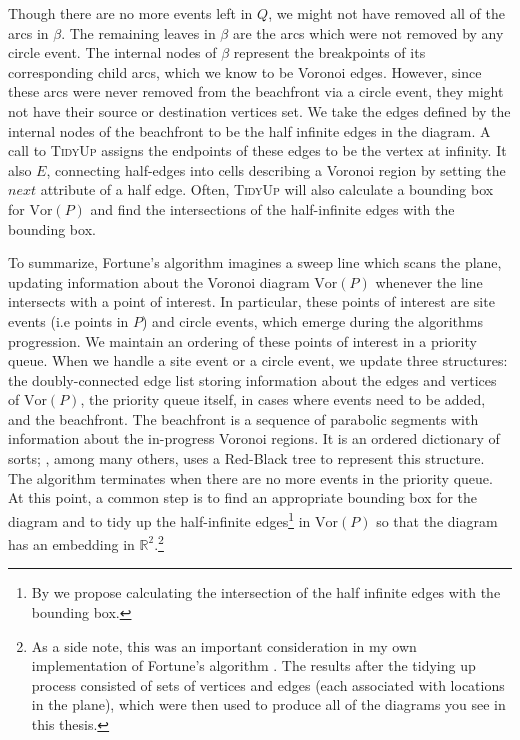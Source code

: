 \documentclass[12pt,twoside]{reedthesis}
\begin{document}
    Though there are no more events left in $Q$, we might not have removed all of the arcs in $\beta$. The remaining leaves in $\beta$ are the arcs which were not removed by any circle event. The internal nodes of $\beta$ represent the breakpoints of its corresponding child arcs, which we know to be Voronoi edges. However, since these arcs were never removed from the beachfront via a circle event, they might not have their source or destination vertices set. We take the edges defined by the internal nodes of the beachfront to be the half infinite edges in the diagram. A call to \textsc{TidyUp} assigns the endpoints of these edges to be the vertex at infinity. It also  $E$, connecting half-edges into cells describing a Voronoi region by setting the $next$ attribute of a half edge. Often, \textsc{TidyUp} will also calculate a bounding box for $\mbox{Vor}(P)$ and find the intersections of the half-infinite edges with the bounding box.\par

    To summarize, Fortune's algorithm imagines a sweep line which scans the plane, updating information about the Voronoi diagram $\mbox{Vor}(P)$ whenever the line intersects with a point of interest. In particular, these points of interest are site events (i.e points in $P$) and circle events, which emerge during the algorithms progression. We maintain an ordering of these points of interest in a priority queue. When we handle a site event or a circle event, we update three structures: the doubly-connected edge list storing information about the edges and vertices of $\mbox{Vor}(P)$, the priority queue itself, in cases where events need to be added, and the beachfront. The beachfront is a sequence of parabolic segments with information about the in-progress Voronoi regions. It is an ordered dictionary of sorts; \citeauthor{deberg}, among many others, uses a Red-Black tree to represent this structure. The algorithm terminates when there are no more events in the priority queue. At this point, a common step is to find an appropriate bounding box for the diagram and to tidy up the half-infinite edges\footnote{By  we propose calculating the intersection of the half infinite edges with the bounding box.} in $\mbox{Vor}(P)$ so that the diagram has an embedding in $\mathds{R}^2$.\footnote{As a side note, this was an important consideration in my own implementation of Fortune's algorithm \cite{ifjorissen}. The results after the tidying up process consisted of sets of vertices and edges (each associated with locations in the plane), which were then used to produce all of the diagrams you see in this thesis.}
\end{document}
